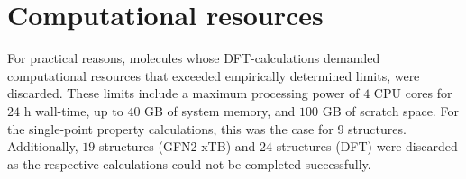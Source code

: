 \section{Computational resources}
For practical reasons, molecules whose DFT-calculations demanded computational resources that exceeded empirically determined limits, were discarded. These limits include a maximum processing power of $4$ CPU cores for $24$ h wall-time, up to $40$ GB of system memory, and $100$ GB of scratch space. For the single-point property calculations, this was the case for $9$ structures. Additionally, $19$ structures (GFN2-xTB) and $24$ structures (DFT) were discarded as the respective calculations could not be completed successfully.